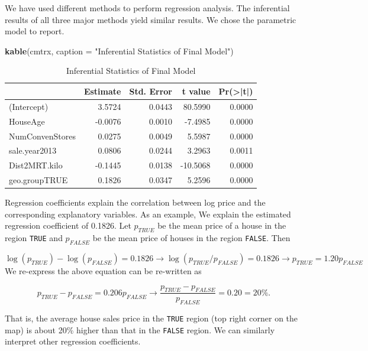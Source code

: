 \documentclass[
]{book}
\newenvironment{Shaded}{\begin{snugshade}}{\end{snugshade}}
\newcommand{\AttributeTok}[1]{\textcolor[rgb]{0.13,0.29,0.53}{#1}}
\newcommand{\FunctionTok}[1]{\textcolor[rgb]{0.13,0.29,0.53}{\textbf{#1}}}
\newcommand{\NormalTok}[1]{#1}
\newcommand{\StringTok}[1]{\textcolor[rgb]{0.31,0.60,0.02}{#1}}
\begin{document}
We have used different methods to perform regression analysis. The inferential results of all three major methods yield similar results. We chose the parametric model to report.

\begin{Shaded}
\begin{Highlighting}[]
\FunctionTok{kable}\NormalTok{(cmtrx, }\AttributeTok{caption =} \StringTok{"Inferential Statistics of Final Model"}\NormalTok{)}
\end{Highlighting}
\end{Shaded}

\begin{table}

\caption{\label{tab:unnamed-chunk-114}Inferential Statistics of Final Model}
\centering
\begin{tabular}[t]{l|r|r|r|r}
\hline
  & Estimate & Std. Error & t value & Pr(>|t|)\\
\hline
(Intercept) & 3.5724 & 0.0443 & 80.5990 & 0.0000\\
\hline
HouseAge & -0.0076 & 0.0010 & -7.4985 & 0.0000\\
\hline
NumConvenStores & 0.0275 & 0.0049 & 5.5987 & 0.0000\\
\hline
sale.year2013 & 0.0806 & 0.0244 & 3.2963 & 0.0011\\
\hline
Dist2MRT.kilo & -0.1445 & 0.0138 & -10.5068 & 0.0000\\
\hline
geo.groupTRUE & 0.1826 & 0.0347 & 5.2596 & 0.0000\\
\hline
\end{tabular}
\end{table}

Regression coefficients explain the correlation between log price and the corresponding explanatory variables. As an example, We explain the estimated regression coefficient of 0.1826. Let \(p_{TRUE}\) be the mean price of a house in the region \texttt{TRUE} and \(p_{FALSE}\) be the mean price of houses in the region \texttt{FALSE}. Then

\[
\log (p_{TRUE}) - \log(p_{FALSE}) = 0.1826  \to \log(p_{TRUE}/p_{FALSE}) = 0.1826 \to p_{TRUE} = 1.20p_{FALSE}
\]
We re-express the above equation can be re-written as

\[
p_{TRUE} - p_{FALSE} = 0.206p_{FALSE} \to \frac{p_{TRUE}-p_{FALSE}}{p_{FALSE}} = 0.20 = 20\%.
\]

That is, the average house sales price in the \texttt{TRUE} region (top right corner on the map) is about 20\% higher than that in the \texttt{FALSE} region. We can similarly interpret other regression coefficients.
\end{document}
